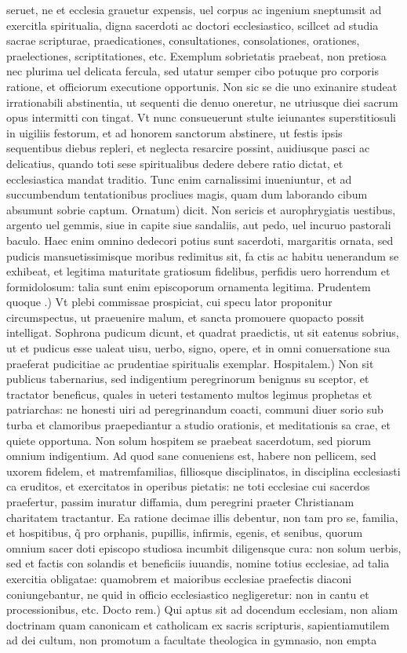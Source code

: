 \documentclass{article}
\begin{document}
\begin{pages}
\marginpar{[ p.496 ]}\pstart seruet, ne et ecclesia grauetur expensis, uel corpus ac ingenium sneptumsit ad exercitla spiritualia, digna sacerdoti ac doctori ecclesiastico, scillcet ad studia sacrae scripturae, praedicationes, consultationes, consolationes, orationes, praelectiones, scriptitationes, etc. Exemplum sobrietatis praebeat, non pretiosa nec plurima uel delicata fercula, sed utatur semper cibo potuque pro corporis ratione, et officiorum executione opportunis. Non sic se die uno exinanire studeat irrationabili abstinentia, ut sequenti die denuo oneretur, ne utriusque diei sacrum opus intermitti con tingat. Vt nunc consueuerunt stulte ieiunantes superstitiosuli in uigiliis festorum, et ad honorem sanctorum abstinere, ut festis ipsis sequentibus diebus repleri, et neglecta resarcire possint, auidiusque pasci ac delicatius, quando toti sese spiritualibus dedere debere ratio dictat, et ecclesiastica mandat traditio. Tunc enim carnalissimi inueniuntur, et ad succumbendum tentationibus procliues magis, quam dum laborando cibum absumunt sobrie captum. Ornatum) dicit. Non sericis et aurophrygiatis uestibus, argento uel gemmis, siue in capite siue sandaliis, aut pedo, uel incuruo pastorali baculo. Haec enim omnino dedecori potius sunt sacerdoti, margaritis ornata, sed pudicis mansuetissimisque moribus redimitus sit, fa ctis ac habitu uenerandum se exhibeat, et legitima maturitate gratiosum fidelibus, perfidis uero horrendum et formidolosum: talia sunt enim episcoporum ornamenta legitima. Prudentem quoque .) Vt plebi commissae prospiciat, cui specu lator proponitur circumspectus, ut praeuenire malum, et sancta promouere quopacto possit intelligat. Sophrona pudicum dicunt, et quadrat praedictis, ut sit eatenus sobrius, ut et pudicus esse ualeat uisu, uerbo, signo, opere, et in omni conuersatione sua praeferat pudicitiae ac prudentiae spiritualis exemplar. Hospitalem.) Non sit publicus tabernarius, sed indigentium peregrinorum benignus su sceptor, et tractator beneficus, quales in ueteri testamento multos legimus prophetas et patriarchas: ne honesti uiri ad peregrinandum coacti, communi diuer sorio sub turba et clamoribus praepediantur a studio orationis, et meditationis sa crae, et quiete opportuna. Non solum hospitem se praebeat sacerdotum, sed piorum omnium indigentium. Ad quod sane conueniens est, habere non pellicem, sed uxorem fidelem, et matremfamilias, filliosque disciplinatos, in disciplina ecclesiasti ca eruditos, et exercitatos in operibus pietatis: ne toti ecclesiae cui sacerdos praefertur, passim inuratur diffamia, dum peregrini praeter Christianam charitatem tractantur. Ea ratione decimae illis debentur, non tam pro se, familia, et hospitibus, q̃ pro orphanis, pupillis, infirmis, egenis, et senibus, quorum omnium sacer doti episcopo studiosa incumbit diligensque cura: non solum uerbis, sed et factis con solandis et beneficiis iuuandis, nomine totius ecclesiae, ad talia exercitia obligatae: quamobrem et maioribus ecclesiae praefectis diaconi coniungebantur, ne quid in officio ecclesiastico negligeretur: non in cantu et processionibus, etc. Docto rem.) Qui aptus sit ad docendum ecclesiam, non aliam doctrinam quam canonicam et catholicam ex sacris scripturis, sapientiamutilem ad dei cultum, non promotum a facultate theologica in gymnasio, non empta 
\end{pages}
\end{document}
